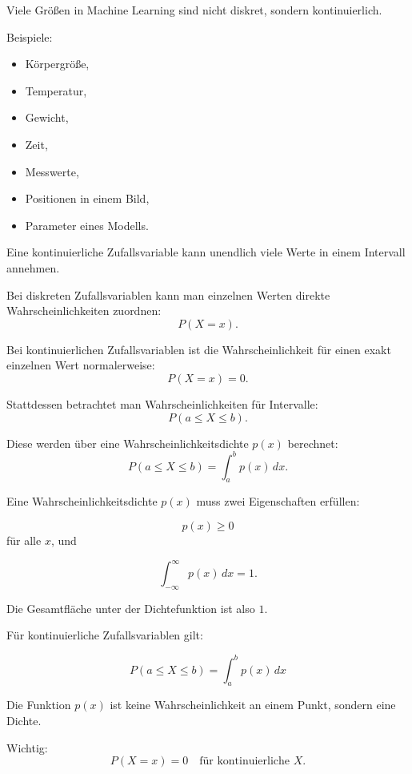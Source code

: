 \documentclass[11pt,a4paper]{scrartcl}
\begin{document}
\begin{notebox}
    Viele Größen in Machine Learning sind nicht diskret, sondern kontinuierlich.

    Beispiele:

    \begin{itemize}
        \item Körpergröße,
        \item Temperatur,
        \item Gewicht,
        \item Zeit,
        \item Messwerte,
        \item Positionen in einem Bild,
        \item Parameter eines Modells.
    \end{itemize}

    Eine kontinuierliche Zufallsvariable kann unendlich viele Werte in einem
    Intervall annehmen.
\end{notebox}

\begin{solutionbox}
    Bei diskreten Zufallsvariablen kann man einzelnen Werten direkte
    Wahrscheinlichkeiten zuordnen:
    \[
        P(X=x).
    \]

    Bei kontinuierlichen Zufallsvariablen ist die Wahrscheinlichkeit für einen
    exakt einzelnen Wert normalerweise:
    \[
        P(X=x)=0.
    \]

    Stattdessen betrachtet man Wahrscheinlichkeiten für Intervalle:
    \[
        P(a \leq X \leq b).
    \]

    Diese werden über eine Wahrscheinlichkeitsdichte \(p(x)\) berechnet:
    \[
        P(a \leq X \leq b)
        =
        \int_a^b p(x)\,dx.
    \]
\end{solutionbox}

\begin{calculationbox}
    Eine Wahrscheinlichkeitsdichte \(p(x)\) muss zwei Eigenschaften erfüllen:

    \[
        p(x) \geq 0
    \]
    für alle \(x\), und

    \[
        \int_{-\infty}^{\infty} p(x)\,dx
        =
        1.
    \]

    Die Gesamtfläche unter der Dichtefunktion ist also \(1\).
\end{calculationbox}

\begin{answerbox}
    Für kontinuierliche Zufallsvariablen gilt:

    \[
        \boxed{
            P(a \leq X \leq b)
            =
            \int_a^b p(x)\,dx
        }
    \]

    Die Funktion \(p(x)\) ist keine Wahrscheinlichkeit an einem Punkt, sondern
    eine Dichte.

    Wichtig:
    \[
        \boxed{
            P(X=x)=0
            \quad \text{für kontinuierliche } X.
        }
    \]
\end{answerbox}
\end{document}
